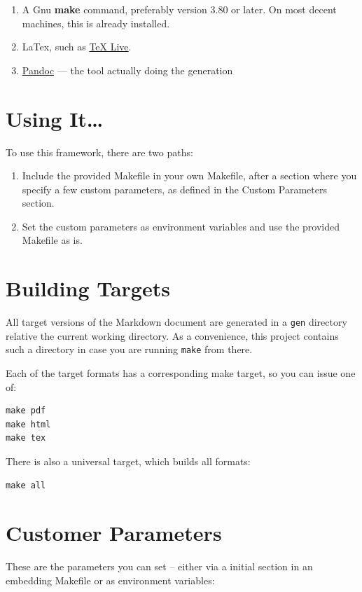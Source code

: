 \documentclass[oneside,]{memoir}
\begin{document}
\begin{enumerate}[1.]
\item
  A Gnu \textbf{make} command, preferably version 3.80 or later. On most
  decent machines, this is already installed.
\item
  LaTex, such as \href{http://www.tug.org/texlive/}{TeX Live}.
\item
  \href{http://johnmacfarlane.net/pandoc/}{Pandoc} --- the tool actually
  doing the generation
\end{enumerate}
\section{Using It\ldots{}}

To use this framework, there are two paths:

\begin{enumerate}[1.]
\item
  Include the provided Makefile in your own Makefile, after a section
  where you specify a few custom parameters, as defined in the Custom
  Parameters section.
\item
  Set the custom parameters as environment variables and use the
  provided Makefile as is.
\end{enumerate}
\section{Building Targets}

All target versions of the Markdown document are generated in a
\texttt{gen} directory relative the current working directory. As a
convenience, this project contains such a directory in case you are
running \texttt{make} from there.

Each of the target formats has a corresponding make target, so you can
issue one of:

\begin{verbatim}
make pdf
make html
make tex
\end{verbatim}
There is also a universal target, which builds all formats:

\begin{verbatim}
make all
\end{verbatim}
\section{Customer Parameters}

These are the parameters you can set -- either via a initial section in
an embedding Makefile or as environment variables:
\end{document}
